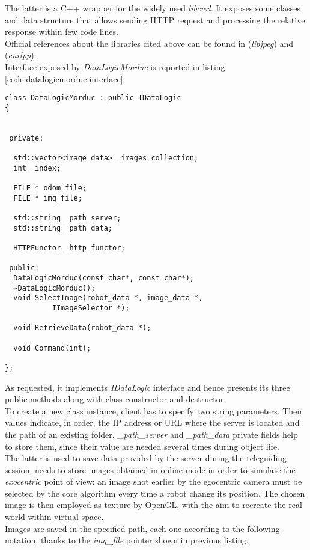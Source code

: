 The latter is a C++ wrapper for the widely used
\textit{libcurl}. It exposes some classes and data structure
that allows sending HTTP request and processing the relative
response within few code lines.
\\
Official references about the libraries cited above can be
found in \cite{library:libjpeg} (\textit{libjpeg}) and
\cite{library:curlpp} (\textit{curlpp}).
\\
Interface exposed by \textit{DataLogicMorduc} is reported in
listing \ref{code:datalogicmorduc:interface}.
\\
\begin{lstlisting}[caption={\texttt{DataLogicLogMorduc} declaration},
    label={code:datalogicmorduc:interface}]
class DataLogicMorduc : public IDataLogic
{
  

 private:

  std::vector<image_data> _images_collection;
  int _index;
  
  FILE * odom_file;
  FILE * img_file;

  std::string _path_server;
  std::string _path_data;

  HTTPFunctor _http_functor;
  
 public:
  DataLogicMorduc(const char*, const char*);
  ~DataLogicMorduc();
  void SelectImage(robot_data *, image_data *,
		   IImageSelector *);

  void RetrieveData(robot_data *);

  void Command(int);

};
\end{lstlisting}

As requested, it implements \textit{IDataLogic} interface and
hence presents its three public methods along with class constructor
and destructor.
\\
To create a new class instance, client has to specify
two string parameters. Their values indicate, in order, the IP
address or URL where the server is located and the path of an
existing folder. \textit{\_path\_server} and \textit{\_path\_data}
private fields help to store them, since their value are needed
several times during object life.
\\
The latter is used to save data provided by the server during the
teleguiding session. \framework{} needs to store images obtained
in online mode in order to simulate the \textit{exocentric} point
of view: an image shot earlier by the egocentric camera must be
selected by the core algorithm every time a robot change its position.
The chosen image is then employed as texture by OpenGL, with the aim
to recreate the real world within virtual space.
\\
Images are saved in the specified path, each one according to the
following notation, thanks to the \textit{img\_file} pointer
shown in previous listing.

